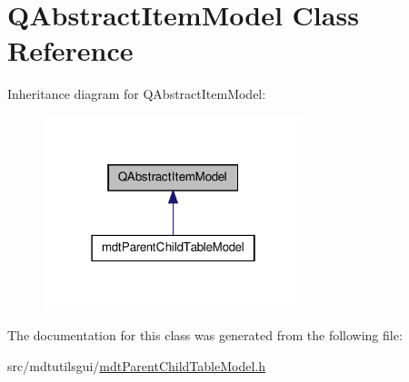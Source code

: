 \hypertarget{class_q_abstract_item_model}{\section{Q\-Abstract\-Item\-Model Class Reference}
\label{class_q_abstract_item_model}
}


Inheritance diagram for Q\-Abstract\-Item\-Model\-:\nopagebreak
\begin{figure}[H]
\begin{center}
\leavevmode
\includegraphics[width=214pt]{class_q_abstract_item_model__inherit__graph}
\end{center}
\end{figure}


The documentation for this class was generated from the following file\-:\begin{DoxyCompactItemize}
\item 
src/mdtutilsgui/\hyperlink{mdt_parent_child_table_model_8h}{mdt\-Parent\-Child\-Table\-Model.\-h}\end{DoxyCompactItemize}
